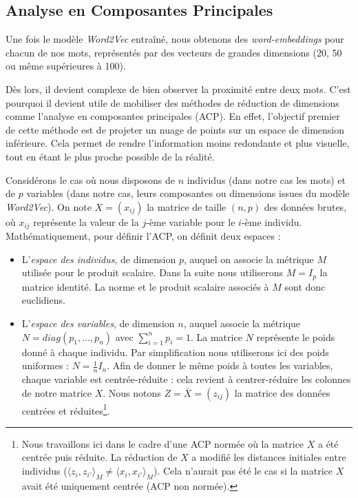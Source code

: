 \documentclass[11pt,french,french]{article}
\let\rmarkdownfootnote\footnote%
\def\footnote{\protect\rmarkdownfootnote}
\begin{document}
\hypertarget{analyse-en-composantes-principales}{%
\subsection{Analyse en Composantes Principales}\label{analyse-en-composantes-principales}}

Une fois le modèle \emph{Word2Vec} entraîné, nous obtenons des \emph{word-embeddings} pour chacun de nos mots, représentés par des vecteurs de grandes dimensions (20, 50 ou même supérieures à 100).

Dès lors, il devient complexe de bien observer la proximité entre deux mots.
C'est pourquoi il devient utile de mobiliser des méthodes de réduction de dimensions comme l'analyse en composantes principales (ACP).
En effet, l'objectif premier de cette méthode est de projeter un nuage de points sur un espace de dimension inférieure.
Cela permet de rendre l'information moins redondante et plus visuelle, tout en étant le plus proche possible de la réalité.

Considérons le cas où nous disposons de \(n\) individus (dans notre cas les mots) et de \(p\) variables (dans notre cas, leurs composantes ou dimensions issues du modèle \emph{Word2Vec}).
On note \(X = (x_{ij})\) la matrice de taille \((n,p)\) des données brutes, où \(x_{ij}\) représente la valeur de la \(j\)-ème variable pour le \(i\)-ème individu. Mathématiquement, pour définir l'ACP, on définit deux espaces :

\begin{itemize}
\item
  L'\emph{espace des individus}, de dimension \(p\), auquel on associe la métrique \(M\) utilisée pour le produit scalaire. Dans la suite nous utiliserons \(M =I_p\) la matrice identité. La norme et le produit scalaire associés à \(M\) sont donc euclidiens.
\item
  L'\emph{espace des variables}, de dimension \(n\), auquel associe la métrique \(N=diag(p_1,...,p_n)\) avec \(\sum_{i=1}^np_i=1\). La matrice \(N\) représente le poids donné à chaque individu. Par simplification nous utiliserons ici des poids uniformes : \(N=\frac{1}{n}I_n\). Afin de donner le même poids à toutes les variables, chaque variable est centrée-réduite : cela revient à centrer-réduire les colonnes de notre matrice \(X\). Nous notons \(Z =\bar X= (z_{ij})\) la matrice des données centrées et réduites\footnote{Nous travaillons ici dans le cadre d'une ACP normée où la matrice \(X\) a été centrée puis réduite. La réduction de \(X\) a modifié les distances initiales entre individus (\(\langle z_i,z_{i'}\rangle_M \neq \langle x_i,x_{i'}\rangle_M\)). Cela n'aurait pas été le cas si la matrice \(X\) avait été uniquement centrée (ACP non normée).}.
\end{itemize}
\end{document}
